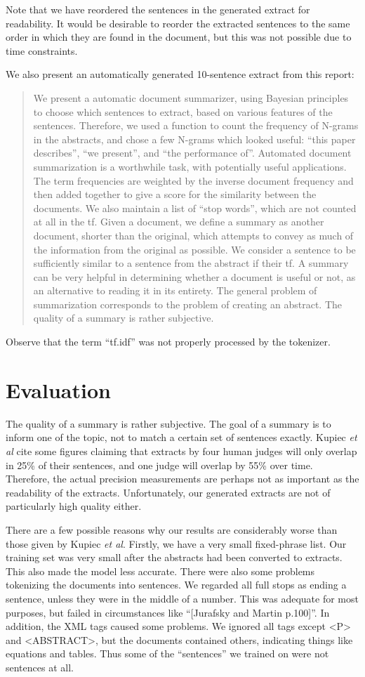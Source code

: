 \documentclass[a4paper, 10pt]{article}
\begin{document}
Note that we have reordered the sentences in the generated extract for readability. It would be desirable to reorder the extracted sentences to the same order in which they are found in the document, but this was not possible due to time constraints.

We also present an automatically generated 10-sentence extract from this report:
\begin{quote}
We present a automatic document summarizer, using Bayesian principles to choose which sentences to extract, based on various features of the sentences. Therefore, we used a function to count the frequency of N-grams in the abstracts, and chose a few N-grams which looked useful: ``this paper describes'', ``we present'', and ``the performance of''. Automated document summarization is a worthwhile task, with potentially useful applications. The term frequencies are weighted by the inverse document frequency and then added together to give a score for the similarity between the documents. We also maintain a list of ``stop words'', which are not counted at all in the tf. Given a document, we define a summary as another document, shorter than the original, which attempts to convey as much of the information from the original as possible. We consider a sentence to be sufficiently similar to a sentence from the abstract if their tf. A summary can be very helpful in determining whether a document is useful or not, as an alternative to reading it in its entirety. The general problem of summarization corresponds to the problem of creating an abstract. The quality of a summary is rather subjective.
\end{quote}
Observe that the term ``tf.idf'' was not properly processed by the tokenizer.

\section{Evaluation}
The quality of a summary is rather subjective. The goal of a summary is to inform one of the topic, not to match a certain set of sentences exactly. Kupiec {\it et al} cite some figures claiming that extracts by four human judges will only overlap in 25\% of their sentences, and one judge will overlap by 55\% over time. Therefore, the actual precision measurements are perhaps not as important as the readability of the extracts. Unfortunately, our generated extracts are not of particularly high quality either.

There are a few possible reasons why our results are considerably worse than those given by Kupiec {\it et al}. Firstly, we have a very small fixed-phrase list. Our training set was very small after the abstracts had been converted to extracts. This also made the model less accurate. There were also some problems tokenizing the documents into sentences. We regarded all full stops as ending a sentence, unless they were in the middle of a number. This was adequate for most purposes, but failed in circumstances like ``[Jurafsky and Martin p.100]''. In addition, the XML tags caused some problems. We ignored all tags except <P> and <ABSTRACT>, but the documents contained others, indicating things like equations and tables. Thus some of the ``sentences'' we trained on were not sentences at all. 
\end{document}

